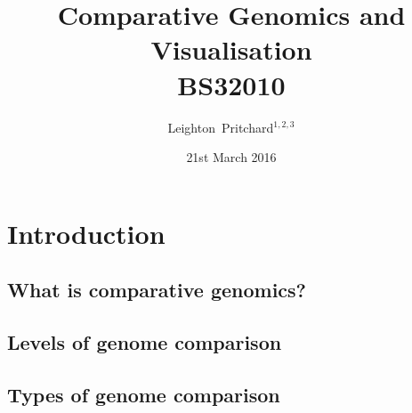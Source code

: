 

%



\title[Comparative Genomics and Visualisation] %
{Comparative Genomics and \\ Visualisation \\
BS32010 \\}
\author[Pritchard] %
{Leighton~Pritchard$^{1,2,3}$}
\date[21st March 2016] %
{21st March 2016}
\subject{Bioinformatics, Genomics, Bacteria, Sequencing, Microbiology, Microbes, Comparative Genomics, Visualisation}





\frame[plain]{\titlepage}



\section{Introduction}

\subsection{What is comparative genomics?}

\subsection{Levels of genome comparison}




\subsection{Types of genome comparison}





